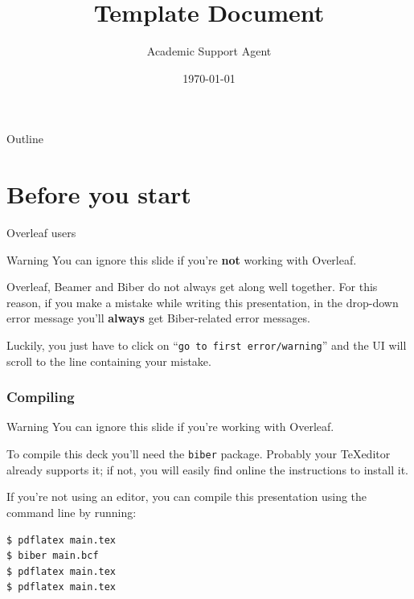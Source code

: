 \documentclass{article}
\title{Template Document}
\author{Academic Support Agent}
\date{\today}
\begin{document}
\maketitle

\begin{frame}
\titlepage
\end{frame}

\begin{frame}{Outline}

\end{frame}

\section{Before you start}
\begin{frame}{Overleaf users}

\begin{alertblock}{Warning}
You can ignore this slide if you're \textbf{not} working with Overleaf.
\end{alertblock}

\vskip 0.5cm

Overleaf, Beamer and Biber do not always get along well together. For this reason, if you make a mistake while writing this presentation, in the drop-down error message you'll \textbf{always} get Biber-related error messages.

\vskip 0.5cm

Luckily, you just have to click on ``\texttt{go to first error/warning}'' and the UI will scroll to the line containing your mistake.

\end{frame}

\begin{frame}[fragile]
\frametitle{Compiling}

\begin{alertblock}{Warning}
You can ignore this slide if you're working with Overleaf.
\end{alertblock}

To compile this deck you'll need the \texttt{biber} package. Probably your \TeX editor already supports it; if not, you will easily find online the instructions to install it.

\vskip 0.5cm

If you're not using an editor, you can compile this presentation using the command line by running:

\begin{verbatim}
$ pdflatex main.tex
$ biber main.bcf
$ pdflatex main.tex
$ pdflatex main.tex
\end{verbatim}


\end{frame}
\end{document}
